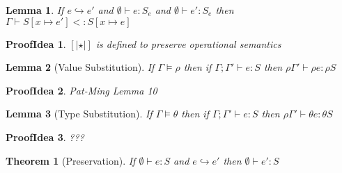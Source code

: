 \documentclass[10pt,a4paper]{article}
\newtheorem{theorem}{Theorem}
\newtheorem{lemma}{Lemma}
\newtheorem*{proofIdea}{ProofIdea}
\newcommand\isWellFormed[2]{\ensuremath{{#1}\models {#2}}}
\newcommand\isSub[3]{\ensuremath{{#1}\vdash {#2}<:{#3}}}
\newcommand\hastype[3]{\ensuremath{{#1}\vdash {#2}:{#3}}}
\newcommand\eval[2]{\ensuremath{{#1}\hookrightarrow {#2}}}
\newcommand\hastypeEmp[2]{\hastype{\emptyset}{#1}{#2}}
\newcommand\sub[2]{\ensuremath{\left[ #1 \mapsto #2 \right]}}
\begin{document}
\begin{lemma}
\label{LemEvalSub}
If \eval{e}{e'} 
and \hastypeEmp{e}{S_e}
and \hastypeEmp{e'}{S_e}
then \isSub{\Gamma}{S\sub{x}{e'}}{S\sub{x}{e}}
\end{lemma}
\begin{proofIdea}
$[| \star|]$ is defined to preserve operational semantics
\end{proofIdea}


\begin{lemma}[Value Substitution]
\label{LemValueSub}
If \isWellFormed{\Gamma}{\rho} 
then if \hastype{\Gamma; \Gamma'}{e}{S}
then \hastype{\rho\Gamma'}{\rho e}{\rho S}
\end{lemma}
\begin{proofIdea}
Pat-Ming Lemma 10
\end{proofIdea}

\begin{lemma}[Type Substitution]
\label{LemTypeSub}
If \isWellFormed{\Gamma}{\theta} 
then if \hastype{\Gamma; \Gamma'}{e}{S}
then \hastype{\rho\Gamma'}{\theta e}{\theta S}
\end{lemma}
\begin{proofIdea}
???
\end{proofIdea}

\begin{theorem}[Preservation]
	If \hastypeEmp{e}{S} and \eval{e}{e'} then \hastypeEmp{e'}{S}
\end{theorem}
	
\end{document}
